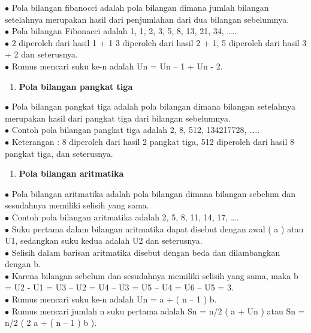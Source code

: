 \documentclass[11pt,fleqn]{book} %
\begin{document}
\noindent $\bullet$ Pola bilangan fibanocci adalah pola bilangan dimana jumlah bilangan setelahnya merupakan hasil dari penjumlahan dari dua bilangan sebelumnya.\\
\noindent$\bullet$ Pola bilangan Fibonacci adalah 1, 1, 2, 3, 5, 8, 13, 21, 34, …..\\
\noindent $\bullet$ 2 diperoleh dari hasil 1 + 1 3 diperoleh dari hasil 2 + 1, 5 diperoleh dari hasil 3 + 2 dan seterusnya.\\
\noindent  $\bullet$ Rumus mencari suku ke-n adalah Un = Un – 1 + Un - 2.\\

\noindent
\begin{enumerate}
	\item  \textbf{  Pola bilangan pangkat tiga}
\end{enumerate}
\noindent
\noindent $\bullet$ Pola bilangan pangkat tiga adalah pola bilangan dimana bilangan setelahnya merupakan hasil dari pangkat tiga dari bilangan sebelumnya.\\
\noindent $\bullet$ Contoh pola bilangan pangkat tiga adalah 2, 8, 512, 134217728, …..\\
\noindent  $\bullet$ Keterangan : 8 diperoleh dari hasil 2 pangkat tiga, 512 diperoleh dari hasil 8 pangkat tiga, dan seterusnya.\\

\noindent
\begin{enumerate}
	\item  \textbf{  Pola bilangan aritmatika}
\end{enumerate}
\noindent
\noindent$\bullet$ Pola bilangan aritmatika adalah pola bilangan dimana bilangan sebelum dan sesudahnya memiliki selisih yang sama.\\
\noindent $\bullet$ Contoh pola bilangan aritmatika adalah 2, 5, 8, 11, 14, 17, ….\\
\noindent $\bullet$ Suku pertama dalam bilangan aritmatika dapat disebut dengan awal ( a ) atau U1, sedangkan suku kedua adalah U2 dan seterusnya.\\
\noindent $\bullet$ Selisih dalam barisan aritmatika disebut dengan beda dan dilambangkan dengan b.\\
\noindent $\bullet$ Karena bilangan sebelum dan sesudahnya memiliki selisih yang sama, maka b = U2 - U1 = U3 – U2 = U4 – U3 = U5 – U4 = U6 – U5 = 3.\\
\noindent $\bullet$ Rumus mencari suku ke-n adalah Un = a + ( n – 1 ) b.\\
\noindent $\bullet$ Rumus mencari jumlah n suku pertama adalah Sn = n/2 ( a + Un ) atau Sn = n/2 ( 2 a + ( n – 1 ) b ).\\
\noindent
\end{document}
